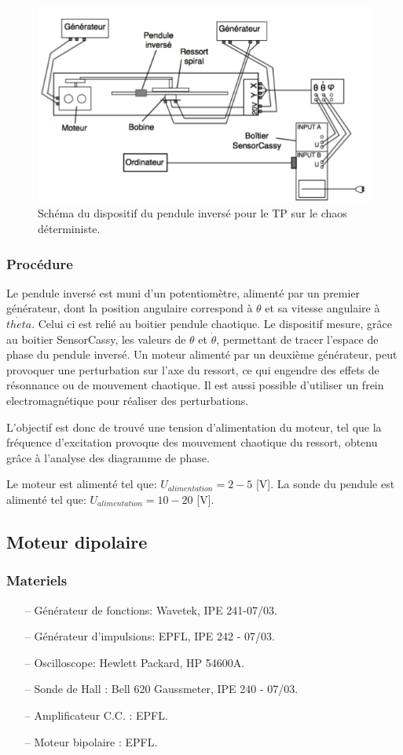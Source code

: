 \documentclass[a4paper,12pt,oneside]{article}
\begin{document}
\begin{figure}[h!]
  \begin{center}
  \includegraphics[width=0.5\linewidth,angle=0]{./figures/pendule_inverse.png}
  \caption{Schéma du dispositif du pendule inversé pour le TP sur le chaos déterministe.} \label{fig:pendule1}
  \end{center}
\end{figure}

\subsubsection{Procédure}

Le pendule inversé est muni d'un potentiomètre, alimenté par un premier générateur, dont la position angulaire correspond à $\theta$ et sa vitesse angulaire à $\dot{theta}$. Celui ci est relié au boitier pendule chaotique.
Le dispositif mesure, grâce au boitier SensorCassy, les valeurs de $\theta$ et $\dot{\theta}$,
permettant de tracer l'espace de phase du pendule inversé.
Un moteur alimenté par un deuxième générateur, peut provoquer une perturbation sur l'axe du ressort, ce qui engendre des effets de résonnance ou de mouvement chaotique. Il est aussi possible d'utiliser un frein electromagnétique pour réaliser des perturbations.

L'objectif est donc de trouvé une tension d'alimentation du moteur, tel que la fréquence d'excitation provoque des mouvement chaotique du ressort, obtenu grâce à l'analyse des diagramme de phase.

Le moteur est alimenté tel que: $U_{alimentation}=2-5$ [V].
La sonde du pendule est alimenté tel que: $U_{alimentation}=10-20$ [V].
\subsection{Moteur dipolaire}

\subsubsection{Materiels}
\begin{itemize}
	\item[--] Générateur de fonctions: Wavetek, IPE 241-07/03.
	\item[--] Générateur d’impulsions: EPFL, IPE 242 - 07/03.
	\item[--] Oscilloscope: Hewlett Packard, HP 54600A.
	\item[--] Sonde de Hall : Bell 620 Gaussmeter, IPE 240 - 07/03.
	\item[--] Amplificateur C.C. : EPFL.
	\item[--] Moteur bipolaire : EPFL.
\end{itemize}
\end{document}
